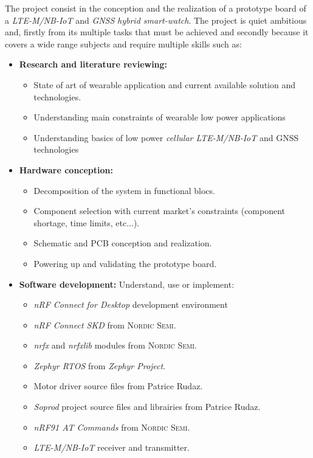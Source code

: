 \documentclass[Report.tex]{subfiles}
\begin{document}
The project consist in the conception and the realization of a prototype board of a \textit{LTE-M/NB-IoT} and \textit{GNSS} \textit{hybrid smart-watch}. The project is quiet ambitious and, firstly from its multiple tasks that must be achieved and secondly because it covers a wide range subjects and require multiple skills such as:
\begin{itemize}
\item \textbf{Research and literature reviewing:}
	\begin{itemize}
		\item State of art of wearable application and current available solution and technologies.
		\item Understanding main constraints of wearable low power applications
		\item Understanding basics of low power \textit{cellular LTE-M/NB-IoT} and GNSS technologies
	\end{itemize}
\item \textbf{Hardware conception: }
	\begin{itemize}
		\item Decomposition of the system in functional blocs.
		\item Component selection with current market's constraints (component shortage, time limits, etc...).
		\item Schematic and PCB conception and realization.
		\item Powering up and validating the prototype board.
	\end{itemize}
\item \textbf{Software development:} Understand, use or implement:
	\begin{itemize}
		\item \textit{nRF Connect for Desktop\cite{nRFConnectForDesktop}} development environment 
		\item \textit{nRF Connect SKD\cite{nRFConnectSDK}} from \textsc{Nordic Semi}.
		\item \textit{nrfx\cite{nrfx}} and \textit{nrfxlib\cite{nrfxlib}} modules from \textsc{Nordic Semi}.
		\item \textit{Zephyr RTOS} from \textit{Zephyr Project\cite{zephyrProject}}.
		\item Motor driver source files from Patrice Rudaz.
		\item \textit{Soprod} project source files and librairies from Patrice Rudaz.
		\item \textit{nRF91 AT Commands} from \textsc{Nordic Semi}.
		\item \textit{LTE-M/NB-IoT} receiver and transmitter.

\end{itemize}
\end{itemize}
\end{document}
